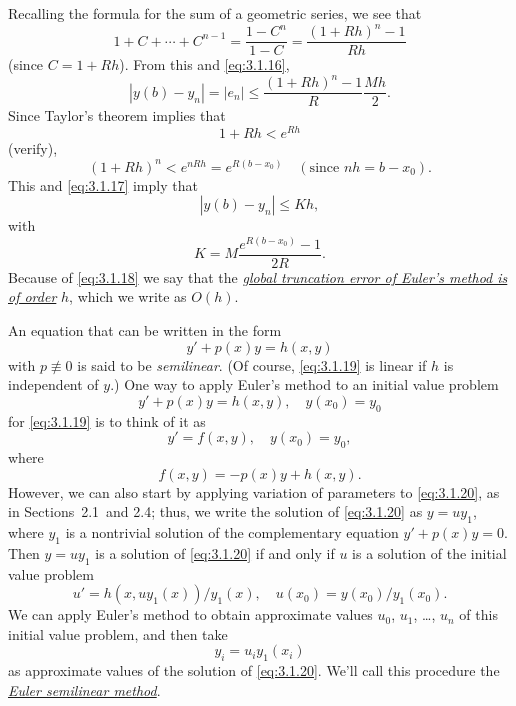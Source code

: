 Recalling the formula for the sum of a geometric series, we see that
\[
  1+C+\cdots+C^{n-1}=\frac{1-C^{n}}{1-C}=\frac{(1+Rh)^{n}-1}{Rh}
\]
(since $C=1+Rh$). From this and \eqref{eq:3.1.16},
\begin{equation}
  \label{eq:3.1.17}|y(b)-y_{n}|=|e_{n}|\le\frac{(1+Rh)^{n}-1}{R}\frac{Mh}{2}.
\end{equation}
Since Taylor's theorem implies that
\[
  1+Rh<e^{Rh}
\]
(verify),
\[
  (1+Rh)^{n}<e^{nRh}=e^{R(b-x_{0})}\quad(\mbox{since }nh=b-x_{0}).
\]
This and \eqref{eq:3.1.17} imply that
\begin{equation}
  \label{eq:3.1.18}|y(b)-y_{n}|\le Kh,
\end{equation}
with
\[
  K=M\frac{e^{R(b-x_{0})}-1}{2R}.
\]
Because of \eqref{eq:3.1.18} we say that the
\href{https://mathshistory.st-andrews.ac.uk/Biographies/Euler/}{\color{blue}
\it global truncation error of Euler's method is of order\/}
$h$, which we write as $O(h)$.


\noindent
An equation that can be written in the form
\begin{equation}
  \label{eq:3.1.19}y'+p(x)y=h(x,y)
\end{equation}
with $p\not\equiv0$ is said to be {\color{blue}\it semilinear\/}. (Of course, \eqref{eq:3.1.19} is
linear if $h$ is independent of $y$.) One way to apply Euler's method to an initial value problem
\begin{equation}
  \label{eq:3.1.20}y'+p(x)y=h(x,y),\quad y(x_{0})=y_{0}
\end{equation}
for \eqref{eq:3.1.19} is to think of it as
\[
  y'=f(x,y),\quad y(x_{0})=y_{0},
\]
where
\[
  f(x,y)=-p(x)y+h(x,y).
\]
However, we can also start by applying variation of parameters to \eqref{eq:3.1.20}, as in
Sections~2.1\ and 2.4; thus, we write the solution of \eqref{eq:3.1.20} as $y=uy_{1}$, where $y_{1}$
is a nontrivial solution of the complementary equation $y'+p(x)y=0$. Then $y=uy_{1}$ is a solution
of \eqref{eq:3.1.20} if and only if $u$ is a solution of the initial value problem
\begin{equation}
  \label{eq:3.1.21}u'=h(x,uy_{1}(x))/y_{1}(x),\quad u(x_{0})=y(x_{0})/y_{1}(x_{0}).
\end{equation}
We can apply Euler's method to obtain approximate values $u_{0}$, $u_{1}$, \dots, $u_{n}$ of this
initial value problem, and then take
\[
  y_{i}=u_{i}y_{1}(x_{i})
\]
as approximate values of the solution of \eqref{eq:3.1.20}. We'll call this procedure the
\href{https://mathshistory.st-andrews.ac.uk/Biographies/Euler/}{\color{blue}
\it Euler semilinear method\/}.


